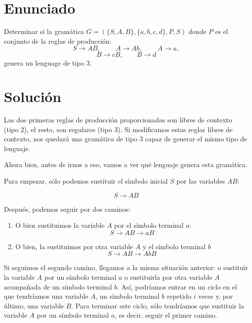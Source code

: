 \documentclass[10pt,a4paper,spanish]{report}
\begin{document}
\section{\textcolor{p6}Enunciado}
Determinar si la gramática $G = (\{S,A,B\}, \{a,b,c,d\}, P, S)$ donde $P$ es el conjunto de la reglas de producción:
\begin{displaymath}
S \rightarrow AB, \qquad\ A \rightarrow Ab, \qquad\ A \rightarrow a,
\end{displaymath}
\begin{displaymath}
B \rightarrow cB, \qquad B \rightarrow d
\end{displaymath}
genera un lenguage de tipo 3.

\section{\textcolor{p6}Solución}
Las dos primeras reglas de producción proporcionadas son libres de contexto (tipo 2), el resto, son regulares (tipo 3). Si modificamos estas reglas libres de contexto, nos quedará una gramática de tipo 3 capaz de generar el mismo tipo de lenguaje.

Ahora bien, antes de irnos a eso, vamos a ver qué lenguaje genera esta gramática.

Para empezar, sólo podemos sustituir el símbolo inicial $S$ por las variables $AB$:

\begin{displaymath}
S \rightarrow AB
\end{displaymath}

Después, podemos seguir por dos caminos:
\begin{enumerate}[\color{p6}{$\heartsuit$}]
  \item O bien sustituimos la variable $A$ por el símbolo terminal $a$:
  \begin{displaymath}
  S \rightarrow AB \rightarrow aB
  \end{displaymath}
  \item O bien, la sustituimos por otra variable $A$ y el símbolo terminal $b$
  \begin{displaymath}
  S \rightarrow AB \rightarrow AbB
  \end{displaymath}
\end{enumerate}

Si seguimos el segundo camino, llegamos a la misma situación anterior: o sustituir la variable $A$ por un símbolo terminal $a$ o sustituirla por otra variable $A$ acompañada de un símbolo terminal $b$. Así, podríamos entrar en un ciclo en el que tendríamos una variable $A$, un símbolo terminal $b$ repetido $i$ veces y, por último, una variable $B$. Para terminar este ciclo, sólo tendríamos que sustituir la variable $A$ por un símbolo terminal $a$, es decir, seguir el primer camino.
\end{document}
